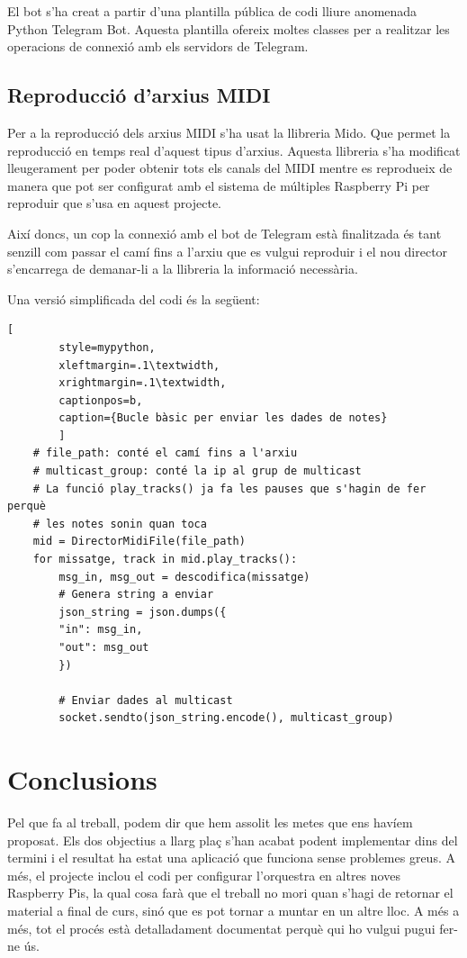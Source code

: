 \documentclass[a4paper]{paper}
\let\oldsection\section
\renewcommand\section{\clearpage\oldsection}
\begin{document}
El bot s'ha creat a partir d'una plantilla pública de codi lliure anomenada Python Telegram Bot\cite{python-telegram-bot}. Aquesta plantilla ofereix moltes classes per a realitzar les operacions de connexió amb els servidors de Telegram.

\subsection{Reproducció d'arxius MIDI}
Per a la reproducció dels arxius MIDI s'ha usat la llibreria Mido\cite{mido}. Que permet la reproducció en temps real d'aquest tipus d'arxius. Aquesta llibreria s'ha modificat lleugerament per poder obtenir tots els canals del MIDI mentre es reprodueix de manera que pot ser configurat amb el sistema de múltiples Raspberry Pi per reproduir que s'usa en aquest projecte.

Així doncs, un cop la connexió amb el bot de Telegram està finalitzada és tant senzill com passar el camí fins a l'arxiu que es vulgui reproduir i el nou director s'encarrega de demanar-li a la llibreria la informació necessària.

Una versió simplificada del codi és la següent:
\begin{lstlisting}[
		style=mypython, 
		xleftmargin=.1\textwidth, 
		xrightmargin=.1\textwidth,
		captionpos=b,
		caption={Bucle bàsic per enviar les dades de notes}
		]
	# file_path: conté el camí fins a l'arxiu
	# multicast_group: conté la ip al grup de multicast
	# La funció play_tracks() ja fa les pauses que s'hagin de fer perquè
	# les notes sonin quan toca
	mid = DirectorMidiFile(file_path)
	for missatge, track in mid.play_tracks():
		msg_in, msg_out = descodifica(missatge)
		# Genera string a enviar
		json_string = json.dumps({
		"in": msg_in,
		"out": msg_out
		})
	
		# Enviar dades al multicast
		socket.sendto(json_string.encode(), multicast_group)
\end{lstlisting}	

\section{Conclusions}
Pel que fa al treball, podem dir que hem assolit les metes que ens havíem proposat. Els dos objectius a llarg plaç s'han acabat podent implementar dins del termini i el resultat ha estat una aplicació que funciona sense problemes greus. A més, el projecte inclou el codi per configurar l'orquestra en altres noves Raspberry Pis, la qual cosa farà que el treball no mori quan s'hagi de retornar el material a final de curs, sinó que es pot tornar a muntar en un altre lloc. A més a més, tot el procés està detalladament documentat perquè qui ho vulgui pugui fer-ne ús.
\end{document}
